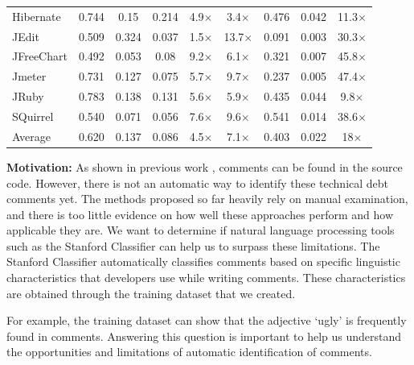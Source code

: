 \begin{table}[!thb]
\begin{center}
\begin{tabular}{l| c c c c c| c c c}
        Hibernate    &  0.744  &   0.15 & 0.214 &  4.9$\times$   &  3.4$\times$   & 0.476  &  0.042  & 11.3$\times$  \\
        JEdit        &  0.509  &  0.324 & 0.037 &  1.5$\times$   &  13.7$\times$  & 0.091  &  0.003  & 30.3$\times$  \\
        JFreeChart   &  0.492  &  0.053 &  0.08 &  9.2$\times$   &  6.1$\times$   & 0.321  &  0.007  & 45.8$\times$    \\
        Jmeter       &  0.731  &  0.127 & 0.075 &  5.7$\times$   &  9.7$\times$   & 0.237  &  0.005  & 47.4$\times$  \\
        JRuby        &  0.783  &  0.138 & 0.131 &  5.6$\times$   &  5.9$\times$   & 0.435  &  0.044  & 9.8$\times$  \\
        SQuirrel     &  0.540  &  0.071 & 0.056 &  7.6$\times$   &  9.6$\times$   & 0.541  &  0.014  & 38.6$\times$  \\
        \midrule 
        Average      &  0.620  & 0.137 & 0.086 &   4.5$\times$   & 7.1$\times$     & 0.403  &  0.022  & 18$\times$  \\ 
        \bottomrule
        \end{tabular}
    \end{center}    
\end{table}

\vspace{3mm}
\noindent\rqi
\vspace{3mm}

\noindent \textbf{Motivation:} As shown in previous work \cite{Potdar2014ICSME, Maldonado2015MTD}, \SATD comments can be found in the source code. However, there is not an automatic way to identify these technical debt comments yet. The methods proposed so far heavily rely on manual examination, and there is too little evidence on how well these approaches perform and how applicable they are. We want to determine if natural language processing tools such as the Stanford Classifier can help us to surpass these limitations. The Stanford Classifier automatically classifies comments based on specific linguistic characteristics that developers use while writing comments. These characteristics are obtained through the training dataset that we created. 

For example, the training dataset can show that the adjective `ugly' is frequently found in \SATD comments. Answering this question is important to help us understand the opportunities and limitations of automatic identification of \SATD comments. 

